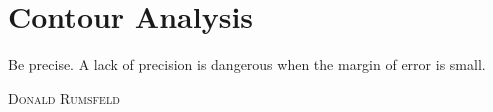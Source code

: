 \newcommand{\smallPath}[1]
{%
\begin{tikzpicture}
\begin{axis}[
	xtick=\empty,
	ytick=\empty,
	scale only axis,
	width=\linewidth,
	height=0.5\linewidth,
]
\addplot table[x=X,y=Y] {#1};
\end{axis}
\end{tikzpicture}
}


\chapter{Contour Analysis}
\label{chap:ContourAnalysis}

\epigraph{Be precise. A lack of precision is dangerous when the margin of error is small.}
{\textsc{Donald Rumsfeld}}

\pagebreak





%